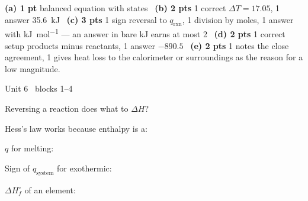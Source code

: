 \documentclass{apchem-worksheet}
\begin{document}
\begin{apcnote}
\textbf{(a) 1 pt} balanced equation with states \textbullet\
\textbf{(b) 2 pts} 1 correct $\Delta T = 17.05$, 1 answer 35.6~kJ
\textbullet\ \textbf{(c) 3 pts} 1 sign reversal to $q_{\text{rxn}}$,
1 division by moles, 1 answer with \si{\kilo\joule\per\mole} --- an answer
in bare kJ earns at most 2 \textbullet\ \textbf{(d) 2 pts} 1 correct setup
products minus reactants, 1 answer $-890.5$ \textbullet\ \textbf{(e) 2 pts}
1 notes the close agreement, 1 gives heat loss to the calorimeter or
surroundings as the reason for a low magnitude.
\end{apcnote}

\begin{spiralstrip}{Unit 6 \textbullet\ blocks 1--4}
  \item Reversing a reaction does what to $\Delta H$?
  \item Hess's law works because enthalpy is a:
  \item $q$ for melting: 
  \item Sign of $q_{\text{system}}$ for exothermic:
  \item $\Delta H_f^\circ$ of an element:
\end{spiralstrip}
\end{document}
